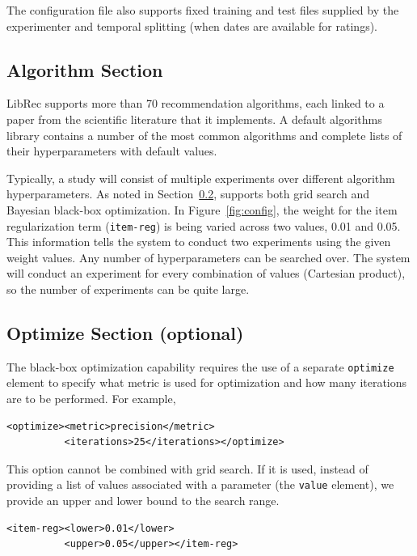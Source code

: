 The configuration file also supports fixed training and test files supplied by the experimenter and temporal splitting (when dates are available for ratings). 

\subsection{Algorithm Section}
\label{subsec:libauto_algos}
LibRec supports more than 70 recommendation algorithms, each linked to a paper from the scientific literature that it implements. A default algorithms library contains a number of the most common algorithms and complete lists of their hyperparameters with default values.

Typically, a study will consist of multiple experiments over different algorithm hyperparameters. As noted in Section~\ref{subsec:libauto_opt}, \libauto{} supports both grid search and Bayesian black-box optimization. In Figure~\ref{fig:config}, the weight for the item regularization term (\texttt{item-reg}) is being varied across two values, 0.01 and 0.05. This information tells the system to conduct two experiments using the given weight values. Any number of hyperparameters can be searched over. The system will conduct an experiment for every combination of values (Cartesian product), so the number of experiments can be quite large.

\subsection{Optimize Section (optional)}
\label{subsec:libauto_opt}
The black-box optimization capability requires the use of a separate \texttt{optimize} element to specify what metric is used for optimization and how many iterations are to be performed. For example,

{\small
\begin{verbatim}
<optimize><metric>precision</metric>
          <iterations>25</iterations></optimize>
\end{verbatim}}

This option cannot be combined with grid search. If it is used, instead of providing a list of values associated with a parameter (the \texttt{value} element), we provide an upper and lower bound to the search range.

{\small
\begin{verbatim}
<item-reg><lower>0.01</lower>
          <upper>0.05</upper></item-reg>
\end{verbatim}}

